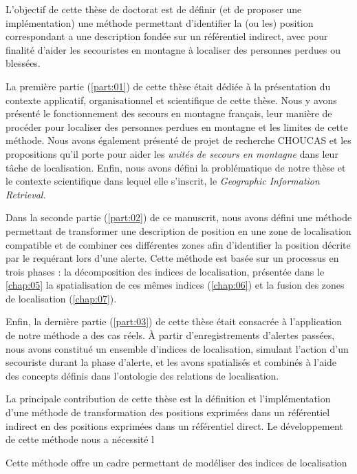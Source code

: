
L'objectif de cette thèse de doctorat est de définir (et de proposer
une implémentation) une méthode permettant d'identifier la (ou les)
position correspondant a une description fondée sur un référentiel
indirect, avec pour finalité d'aider les secouristes en montagne à
localiser des personnes perdues ou blessées.

La première partie (\ref{part:01}) de cette thèse était dédiée à la
présentation du contexte applicatif, organisationnel et scientifique
de cette thèse. Nous y avons présenté le fonctionnement des secours en
montagne français, leur manière de procéder pour localiser des
personnes perdues en montagne et les limites de cette méthode. Nous
avons également présenté de projet de recherche CHOUCAS et les
propositions qu'il porte pour aider les \emph{unités de secours en
  montagne} dans leur tâche de localisation. Enfin, nous avons défini
la problématique de notre thèse et le contexte scientifique dans
lequel elle s'inscrit, le \emph{Geographic Information Retrieval.}

Dans la seconde partie (\ref{part:02}) de ce manuscrit, nous avons
défini une méthode permettant de transformer une description de
position en une zone de localisation compatible et de combiner ces
différentes zones afin d’identifier la position décrite par le
requérant lors d'une alerte. Cette méthode est basée sur un processus
en trois phases : la décomposition des indices de localisation,
présentée dans le \autoref{chap:05} la spatialisation de ces mêmes
indices (\autoref{chap:06}) et la fusion des zones de localisation
(\autoref{chap:07}).

Enfin, la dernière partie (\ref{part:03}) de cette thèse était
consacrée à l’application de notre méthode a des cas réels. À partir
d'enregistrements d'alertes passées, nous avons constitué un ensemble
d'indices de localisation, simulant l'action d'un secouriste durant la
phase d'alerte, et les avons spatialisés et combinés à l'aide des
concepts définis dans l'ontologie des relations de localisation.


La principale contribution de cette thèse est la définition et
l'implémentation d'une méthode de transformation des positions
exprimées dans un référentiel indirect en des positions exprimées dans
un référentiel direct.
%
Le développement de cette méthode nous a nécessité l 

Cette méthode offre un cadre permettant de modéliser des indices de
localisation 

